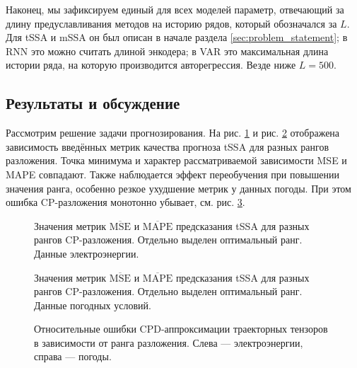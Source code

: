 			Наконец, мы зафиксируем единый для всех моделей параметр, отвечающий за длину предуславливания методов на историю рядов, который обозначался за $ L $. Для tSSA и mSSA он был описан в начале раздела \ref{sec:problem_statement}; в RNN это можно считать длиной энкодера; в VAR это максимальная длина истории ряда, на которую производится авторегрессия. Везде ниже $ L = 500 $.		
				
		\subsection*{Результаты и обсуждение}
		
			Рассмотрим решение задачи прогнозирования. На рис. \ref{fig:mse_mape_electr} и рис. \ref{fig:mse_mape_weather} отображена зависимость введённых метрик качества прогноза tSSA для разных рангов разложения. Точка минимума и характер рассматриваемой зависимости MSE и MAPE совпадают. Также наблюдается эффект переобучения при повышении значения ранга, особенно резкое ухудшение метрик у данных погоды. При этом ошибка CP-разложения монотонно убывает, см. рис. \ref{fig:cpd_errors}.
			
			\begin{figure}[h!]
				\centering
				\caption{Значения метрик $ \overline{\text{MSE}} $ и $ \overline{\text{MAPE}} $ предсказания tSSA для разных рангов CP-разложения. Отдельно выделен оптимальный ранг. Данные электроэнергии.}\label{fig:mse_mape_electr}
			\end{figure}
			
			\begin{figure}[h!]
				\centering
				\caption{Значения метрик $ \overline{\text{MSE}} $ и $ \overline{\text{MAPE}} $ предсказания tSSA для разных рангов CP-разложения. Отдельно выделен оптимальный ранг. Данные погодных условий.}\label{fig:mse_mape_weather}
			\end{figure}
			
			\begin{figure}[h!]
				\centering
				\caption{Относительные ошибки CPD-аппроксимации траекторных тензоров в зависимости от ранга разложения. Слева --- электроэнергии, справа --- погоды.}\label{fig:cpd_errors}
			\end{figure}
			
